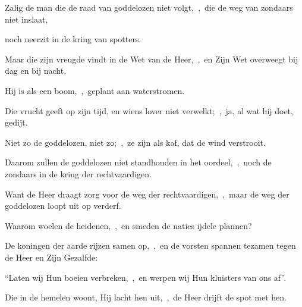 \documentclass[12pt,twoside,a5paper]{article}
\begin{document}





\begin{halfparskip}

   Zalig de man die de raad van goddelozen niet volgt,~\sep\ die de weg van zondaars niet inslaat,


  noch neerzit in de kring van spotters.

  Maar die zijn vreugde vindt in de Wet van de Heer,~\sep\ en Zijn Wet overweegt bij dag en bij nacht.

  Hij is als een boom,~\sep\ geplant aan waterstromen.

  Die vrucht geeft op zijn tijd, en wiens lover niet verwelkt;~\sep\ ja, al wat hij doet, gedijt.

  Niet zo de goddelozen, niet zo;~\sep\ ze zijn als kaf, dat de wind verstrooit.

  Daarom zullen de goddelozen niet standhouden in het oordeel,~\sep\ noch de zondaars in de kring der
  rechtvaardigen.

  Want de Heer draagt zorg voor de weg der rechtvaardigen,~\sep\ maar de weg der goddelozen loopt uit op verderf.

   Waarom woelen de heidenen,~\sep\ en smeden de naties ijdele plannen?

  De koningen der aarde rijzen samen op,~\sep\ en de vorsten spannen tezamen tegen de Heer en Zijn Gezalfde:

  ``Laten wij Hun boeien verbreken,~\sep\ en werpen wij Hun kluisters van ons af''.

  Die in de hemelen woont, Hij lacht hen uit,~\sep\ de Heer drijft de spot met hen.


\end{halfparskip}
\end{document}
